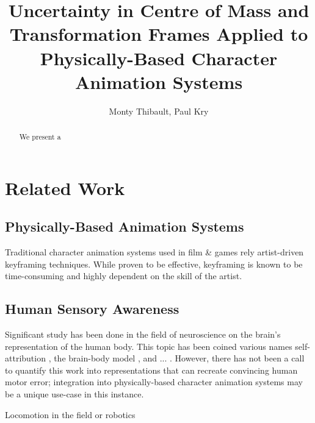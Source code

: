 \documentclass[]{article}
\title{Uncertainty in Centre of Mass and Transformation Frames Applied to Physically-Based Character Animation Systems}
\author{Monty Thibault, Paul Kry}
\begin{document}
\maketitle

\begin{abstract}
We present a 
\end{abstract}

\section{Related Work}
\subsection{Physically-Based Animation Systems}

Traditional character animation systems used in film \& games rely artist-driven keyframing techniques. While proven to be effective, keyframing is known to be time-consuming and highly dependent on the skill of the artist.

\subsection{Human Sensory Awareness}

Significant study has been done in the field of neuroscience on the brain's representation of the human body. This topic has been coined various names self-attribution \cite{2010-TOG-gbwc}, the brain-body model \cite{}, and ... . However, there has not been a call to quantify this work into representations that can recreate convincing human motor error; integration into physically-based character animation systems may be a unique use-case in this instance.

Locomotion in the field or robotics



\end{document}
